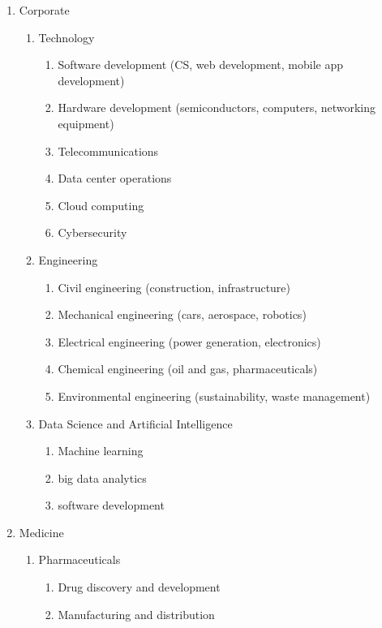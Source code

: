 \begin{enumerate}
    \item Corporate
    \begin{enumerate}
        \item Technology
        \begin{enumerate}
            \item Software development (CS, web development, mobile app development)
            \item Hardware development (semiconductors, computers, networking equipment)
            \item Telecommunications
            \item Data center operations
            \item Cloud computing
            \item Cybersecurity
        \end{enumerate}
        \item Engineering
        \begin{enumerate}
            \item Civil engineering (construction, infrastructure)
            \item Mechanical engineering (cars, aerospace, robotics)
            \item Electrical engineering (power generation, electronics)
            \item Chemical engineering (oil and gas, pharmaceuticals)
            \item Environmental engineering (sustainability, waste management)
        \end{enumerate}
        \item Data Science and Artificial Intelligence 
        \begin{enumerate}
            \item Machine learning
            \item big data analytics
            \item software development
        \end{enumerate}
    \end{enumerate}
    \item Medicine
    \begin{enumerate}
        \item Pharmaceuticals
        \begin{enumerate}
            \item Drug discovery and development
            \item Manufacturing and distribution

\end{enumerate}
\end{enumerate}
\end{enumerate}
